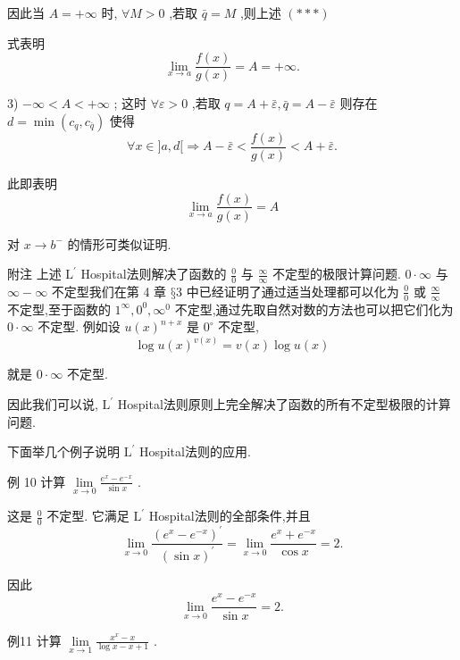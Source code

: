因此当 $A =  + \infty$ 时, $\forall M > 0$ ,若取 $\bar{q} = M$ ,则上述 $\left( {* *  * }\right)$

式表明
$$\mathop{\lim }\limits_{{x \rightarrow  a}}\frac{f\left( x\right) }{g\left( x\right) } = A =  + \infty .$$

3) $- \infty  < A <  + \infty$ ; 这时 $\forall \varepsilon  > 0$ ,若取 $q = A + \bar{\varepsilon },\bar{q} = A - \bar{\varepsilon }$ 则存在 $d = \min \left( {{c}_{q},{c}_{\bar{q}}}\right)$ 使得
$$\forall x \in  \rbrack a,d\lbrack  \Rightarrow  A - \bar{\varepsilon } < \frac{f\left( x\right) }{g\left( x\right) } < A + \bar{\varepsilon }.$$

此即表明
$$\mathop{\lim }\limits_{{x \rightarrow  a}}\frac{f\left( x\right) }{g\left( x\right) } = A$$

对 $x \rightarrow  {b}^{ - }$ 的情形可类似证明.

附注 上述 ${\mathrm{L}}^{\prime }$ Hospital法则解决了函数的 $\frac{0}{0}$ 与 $\frac{\infty }{\infty }$ 不定型的极限计算问题. $0 \cdot  \infty$ 与 $\infty  - \infty$ 不定型我们在第 4 章 $§3$ 中已经证明了通过适当处理都可以化为 $\frac{0}{0}$ 或 $\frac{\infty }{\infty }$ 不定型,至于函数的 ${1}^{\infty },{0}^{0},{\infty }^{0}$ 不定型,通过先取自然对数的方法也可以把它们化为 $0 \cdot  \infty$ 不定型. 例如设 $u{\left( x\right) }^{n + x}$ 是 ${0}^{ \circ  }$ 不定型,
$$\log u{\left( x\right) }^{v\left( x\right) } = v\left( x\right) \log u\left( x\right)$$

就是 $0 \cdot  \infty$ 不定型.

因此我们可以说, ${\mathrm{L}}^{\prime }$ Hospital法则原则上完全解决了函数的所有不定型极限的计算问题.

下面举几个例子说明 ${\mathrm{L}}^{\prime }$ Hospital法则的应用.

例 10 计算 $\mathop{\lim }\limits_{{x \rightarrow  0}}\frac{{e}^{x} - {e}^{-x}}{\sin x}$ .

这是 $\frac{0}{0}$ 不定型. 它满足 ${\mathrm{L}}^{\prime }$ Hospital法则的全部条件,并且
$$\mathop{\lim }\limits_{{x \rightarrow  0}}\frac{{\left( {e}^{x} - {e}^{-x}\right) }^{\prime }}{{\left( \sin x\right) }^{\prime }} = \mathop{\lim }\limits_{{x \rightarrow  0}}\frac{{e}^{x} + {e}^{-x}}{\cos x} = 2.$$

因此
$$\mathop{\lim }\limits_{{x \rightarrow  0}}\frac{{e}^{x} - {e}^{-x}}{\sin x} = 2.$$

例11 计算 $\mathop{\lim }\limits_{{x \rightarrow  1}}\frac{{x}^{x} - x}{\log x - x + 1}$ .

